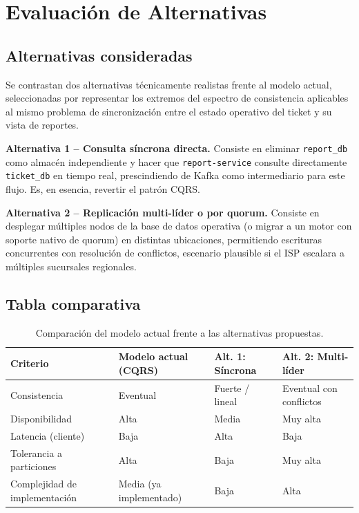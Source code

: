 \documentclass[12pt, a4paper]{article}
\begin{document}
\section{Evaluación de Alternativas}

\subsection{Alternativas consideradas}
Se contrastan dos alternativas técnicamente realistas frente al modelo actual, seleccionadas por representar los extremos del espectro de consistencia aplicables al mismo problema de sincronización entre el estado operativo del ticket y su vista de reportes.

\textbf{Alternativa 1 -- Consulta síncrona directa.} Consiste en eliminar \texttt{report\_db} como almacén independiente y hacer que \texttt{report-service} consulte directamente \texttt{ticket\_db} en tiempo real, prescindiendo de Kafka como intermediario para este flujo. Es, en esencia, revertir el patrón CQRS.

\textbf{Alternativa 2 -- Replicación multi-líder o por quorum.} Consiste en desplegar múltiples nodos de la base de datos operativa (o migrar a un motor con soporte nativo de quorum) en distintas ubicaciones, permitiendo escrituras concurrentes con resolución de conflictos, escenario plausible si el ISP escalara a múltiples sucursales regionales.

\subsection{Tabla comparativa}
\begin{table}[H]
\centering
\caption{Comparación del modelo actual frente a las alternativas propuestas.}
\label{tab:comparacion}
\small
\begin{tabular}{@{}
    >{\raggedright\arraybackslash}p{4.1cm}
    >{\centering\arraybackslash}p{4.5cm}
    >{\centering\arraybackslash}p{3.1cm}
    >{\centering\arraybackslash}p{4cm}@{}}
\toprule
\textbf{Criterio} & \textbf{Modelo actual (CQRS)} & \textbf{Alt. 1: Síncrona} & \textbf{Alt. 2: Multi-líder} \\
\midrule
Consistencia                  & Eventual                 & Fuerte / lineal   & Eventual con conflictos \\
Disponibilidad                & Alta                     & Media             & Muy alta \\
Latencia (cliente)            & Baja                     & Alta              & Baja \\
Tolerancia a particiones      & Alta                     & Baja              & Muy alta \\
Complejidad de implementación & Media (ya implementado) & Baja              & Alta \\
\bottomrule
\end{tabular}
\end{table}
\end{document}
